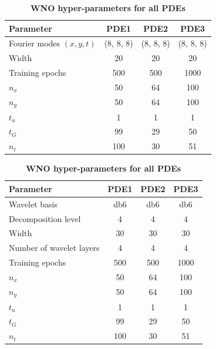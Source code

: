 \begin{table}[htbp]
\centering
\scriptsize
\setlength{\tabcolsep}{4pt}
\begin{minipage}[t]{0.48\textwidth}
\centering
\caption{\scriptsize\textbf{FNO hyper-parameters for all PDEs}}
\label{tab:fno_hparams}
\begin{tabular}{lccc}
\hline
\textbf{Parameter} & \textbf{PDE1} & \textbf{PDE2} & \textbf{PDE3} \\
\hline
Fourier modes $(x, y, t)$ & (8, 8, 8) & (8, 8, 8) & (8, 8, 8) \\
Width & 20 & 20 & 20 \\
Training epochs & 500 & 500 & 1000\\
$n_x$ & 50& 64& 100\\
$n_y$ & 50& 64& 100\\
$t_u$ & 1& 1& 1\\
$t_G$ & 99& 29& 50\\
$n_t$ & 100& 30& 51\\
\hline
\end{tabular}
\end{minipage}%
\hfill
\begin{minipage}[t]{0.48\textwidth}
\centering
\caption{\scriptsize\textbf{WNO hyper-parameters for all PDEs}}
\label{tab:wno_hparams}
\begin{tabular}{lccc}
\hline
\textbf{Parameter} & \textbf{PDE1} & \textbf{PDE2} & \textbf{PDE3} \\
\hline
Wavelet basis & db6 & db6 & db6 \\
Decomposition level & 4 & 4 & 4 \\
Width & 30 & 30 & 30 \\
Number of wavelet layers & 4 & 4 & 4 \\
Training epochs & 500 & 500 & 1000\\
$n_x$ & 50& 64& 100\\
$n_y$ & 50& 64& 100\\
$t_u$ & 1& 1& 1\\
$t_G$ & 99& 29& 50\\
$n_t$ & 100& 30& 51\\
\hline
\end{tabular}
\end{minipage}
\end{table}



